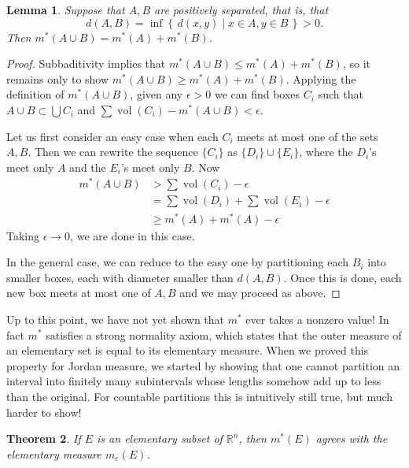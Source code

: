 \documentclass[10pt,oneside]{amsbook}
\newcommand{\set}[1]{\left\{\,#1\,\right\}}
\newcommand{\RR}{{\mathbb R}}
\DeclareMathOperator{\vol}{vol}
\theoremstyle{definition}
\theoremstyle{plain}
\newtheorem{thm}{Theorem}[section]
\newtheorem{lem}[thm]{Lemma}
\theoremstyle{definition}
\theoremstyle{remark}
\numberwithin{equation}{section}
\numberwithin{figure}{section}
\begin{document}

\begin{lem}
  \label{lem:separated}
  Suppose that $A,B$ are positively separated, that is, that 
  \[d(A,B)=\inf\set{d(x,y)\mid x\in A, y\in B}>0.\]
  Then $m^*(A\cup B)=m^*(A)+m^*(B)$.
\end{lem}

\begin{proof}
  Subbaditivity implies that $m^*(A\cup B)\leq m^*(A)+m^*(B)$, so it remains only to show $m^*(A\cup B)\geq m^*(A)+m^*(B)$. Applying the definition of $m^*(A\cup B)$, given any $\epsilon>0$ we can find boxes $C_i$ such that $A\cup B\subset\bigcup C_i$ and $\sum\vol(C_i)-m^*(A\cup B)<\epsilon$.

  Let us first consider an easy case when each $C_i$ meets at most one of the sets $A,B$. Then we can rewrite the sequence $\{C_i\}$ as $\{D_i\}\cup\{E_i\}$, where the $D_i$'s meet only $A$ and the $E_i$'s meet only $B$. Now
  \begin{align*}
    m^*(A\cup B)&>\sum\vol(C_i)-\epsilon\\
                &=\sum\vol(D_i)+\sum\vol(E_i)-\epsilon\\
                &\geq m^*(A)+m^*(A)-\epsilon
  \end{align*}
  Taking $\epsilon\to0$, we are done in this case.

  In the general case, we can reduce to the easy one by partitioning each $B_i$ into smaller boxes, each with diameter smaller than $d(A,B)$. Once this is done, each new box meets at most one of $A,B$ and we may proceed as above.
\end{proof}

Up to this point, we have not yet shown that $m^*$ ever takes a nonzero value! In fact $m^*$ satisfies a strong normality axiom, which states that the outer measure of an elementary set is equal to its elementary measure. When we proved this property for Jordan measure, we started by showing that one cannot partition an interval into finitely many subintervals whose lengths somehow add up to less than the original. For countable partitions this is intuitively still true, but much harder to show!

\begin{thm}
  If $E$ is an elementary subset of $\RR^n$, then $m^*(E)$ agrees with the elementary measure $m_e(E)$.
\end{thm}
\end{document}
